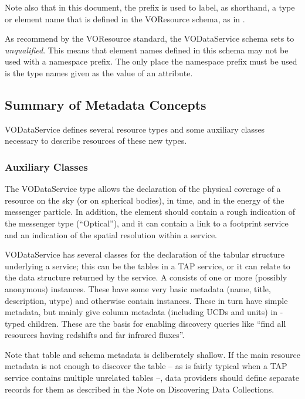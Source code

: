 \documentclass[11pt,a4paper]{ivoa}
\begin{document}
Note also that in this document, the  prefix is used to
label, as shorthand, a type or element name that is defined in the
VOResource schema, as in .




As recommend by the VOResource standard, the
VODataService schema sets  to \emph{unqualified}.
This means that element names defined
in this schema may not be used with a namespace prefix.
The only place the namespace prefix must be used is the
type names given as the value of an
 attribute.  


\subsection{Summary of Metadata Concepts}
\label{sect:summ}


VODataService defines several resource types and some auxiliary classes
necessary to describe resources of these new types.

\subsubsection{Auxiliary Classes}

The VODataService type  allows the declaration of
the physical coverage of a resource on the sky (or on spherical bodies),
in time, and in the energy of the messenger particle.  In addition, the
element should contain a rough indication of the messenger type
(``Optical''), and it can contain a link to a footprint service and an
indication of the spatial resolution within a service.

VODataService has several classes for the declaration of the tabular
structure underlying a service; this can be the tables in a TAP service,
or it can relate to the data structure returned by the service.  A
 consists of one or more (possibly anonymous)
 instances.  These have some very basic metadata
(name, title, description, utype) and otherwise contain 
instances.  These in turn have simple metadata, but mainly give column
metadata (including UCDs and units) in -typed
children.  These are the basis for enabling discovery queries like
``find all resources having redshifts and far infrared fluxes''.

Note that table and schema metadata is deliberately shallow.  If the
main resource metadata is not enough to discover the table -- as is
fairly typical when a TAP service contains multiple unrelated tables --,
data providers should define separate records for them as described in
the Note on Discovering Data Collections.
\end{document}
